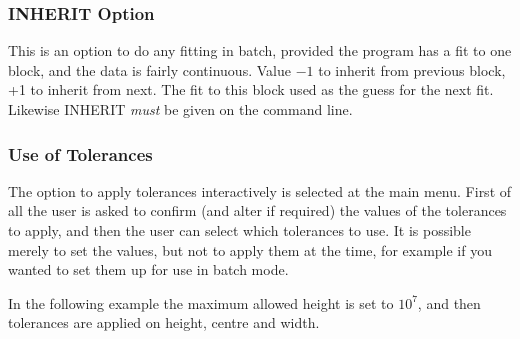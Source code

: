 \subsubsection{INHERIT Option}

This is an option to do any fitting in batch, provided the program has
a fit to one block, and the data is fairly continuous. Value $-1$ to
inherit from previous block, +1 to inherit from next.
The fit to this block used as the guess for the next fit.
Likewise INHERIT {\em must} be given on the command line.

\subsubsection{Use of Tolerances}
\label{sec.tols}

The option to apply tolerances interactively is selected at the main
menu.
First of all the user is asked to confirm (and alter if required) the
values of the tolerances to apply, and then the user can select which
tolerances to use.
It is possible merely to set the values, but not to apply them at the
time, for example if you wanted to set them up for use in batch mode.

In the following example the maximum allowed height is set to $10^{7}$,
and then tolerances are applied on height, centre and width.

